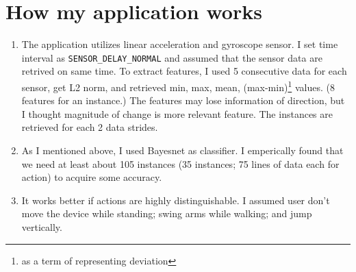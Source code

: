 \documentclass[11pt,a4paper]{article}
\begin{document}
	\section {How my application works}
	\begin{enumerate}
		\item The application utilizes linear acceleration and gyroscope sensor. I set time interval as \texttt{SENSOR\_DELAY\_NORMAL} and assumed that the sensor data are retrived on same time. To extract features, I used 5 consecutive data for each sensor, get L2 norm, and retrieved min, max, mean, (max-min)\footnote{as a term of representing deviation} values. (8 features for an instance.) The features may lose information of direction, but I thought magnitude of change is more relevant feature. The instances are retrieved for each 2 data strides. 
		
		\item As I mentioned above, I used Bayesnet as classifier. I emperically found that we need at least about 105 instances (35 instances; 75 lines of data each for action) to acquire some accuracy.
		
		\item It works better if actions are highly distinguishable. I assumed user don't move the device while standing; swing arms while walking; and jump vertically.
	\end{enumerate}
\end{document}
